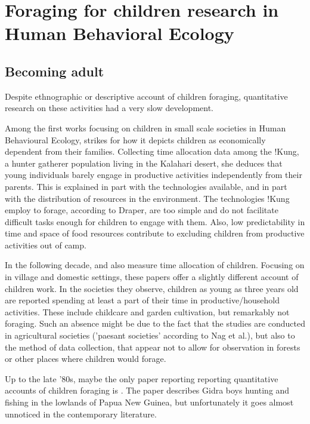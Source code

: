 \section{Foraging for children research in Human Behavioral Ecology}

\subsection{Becoming adult}
Despite ethnographic or descriptive account of children foraging, quantitative research on these activities had a very slow development.

Among the first works focusing on children in small scale societies in Human Behavioural Ecology, \cite{lee_social_1976} strikes for how it depicts children as economically dependent from their families. Collecting time allocation data among the !Kung, a hunter gatherer population living in the Kalahari desert, she deduces that young individuals barely engage in productive activities independently from their parents. This is explained in part with the technologies available, and in part with the distribution of resources in the environment. The technologies !Kung employ to forage, according to Draper, are too simple and do not facilitate difficult tasks enough for children to engage with them. Also, low predictability in time and space of food resources contribute to excluding children from productive activities out of camp. 

In the following decade, \cite{nag_anthropological_1978} and \cite{munroe_childrens_1984} also measure time allocation of children. Focusing on in village and domestic settings, these papers offer a slightly different account of children work. In the societies they observe, children as young as three years old are reported spending at least a part of their time in productive/household activities. These include childcare and garden cultivation, but remarkably not foraging. Such an absence might be due to the fact that the studies are conducted in agricultural societies ('paesant societies' according to Nag et al.), but also to the method of data collection, that appear not to allow for observation in forests or other places where children would forage. 

Up to the late '80s, maybe the only paper reporting reporting quantitative accounts of children foraging is \cite{kawabe_development_1983}. The paper describes Gidra boys hunting and fishing in the lowlands of Papua New Guinea, but unfortunately it goes almost unnoticed in the contemporary literature. 

